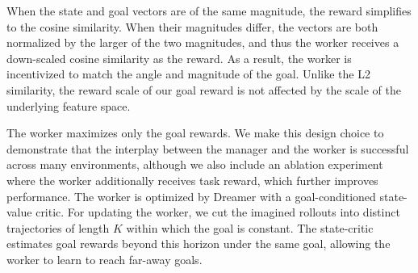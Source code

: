 
When the state and goal vectors are of the same magnitude, the reward simplifies to the cosine similarity.
When their magnitudes differ, the vectors are both normalized by the larger of the two magnitudes, and thus the worker receives a down-scaled cosine similarity as the reward.
As a result, the worker is incentivized to match the angle and magnitude of the goal.
Unlike the L2 similarity, the reward scale of our goal reward is not affected by the scale of the underlying feature space.

The worker maximizes only the goal rewards.
We make this design choice to demonstrate that the interplay between the manager and the worker is successful across many environments, although we also include an ablation experiment where the worker additionally receives task reward, which further improves performance.
The worker is optimized by Dreamer with a goal-conditioned state-value critic.
For updating the worker, we cut the imagined rollouts into distinct trajectories of length $K$ within which the goal is constant.
The state-critic estimates goal rewards beyond this horizon under the same goal, allowing the worker to learn to reach far-away goals.
